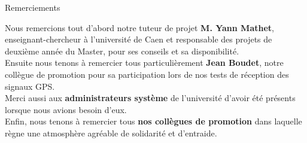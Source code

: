 {\Huge{Remerciements}}

\vspace{2cm}
Nous remercions tout d'abord notre tuteur de projet \textbf{M. Yann Mathet}, enseignant-chercheur à l'université de Caen et responsable des projets de deuxième année du Master, pour ses conseils et sa disponibilité.\\

Ensuite nous tenons à remercier tous particulièrement \textbf{Jean Boudet}, notre collègue de promotion pour sa participation lors de nos tests de réception des signaux GPS.\\

Merci aussi aux \textbf{administrateurs système} de l'université d'avoir été présents lorsque nous avions besoin d'eux.\\

Enfin, nous tenons à remercier tous \textbf{nos collègues de promotion} dans laquelle règne une atmosphère agréable de solidarité et d'entraide.\\

